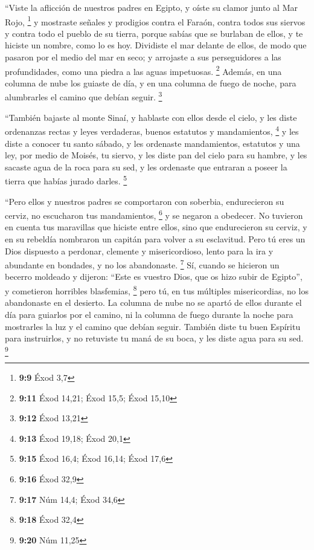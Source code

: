 \begin{paracol}{2}
 ``Viste la aflicción de nuestros padres en Egipto, y
oíste su clamor junto al Mar Rojo, \footnote{\textbf{9:9} Éxod 3,7}
 y mostraste señales y prodigios contra el Faraón, contra
todos sus siervos y contra todo el pueblo de su tierra, porque sabías
que se burlaban de ellos, y te hiciste un nombre, como lo es hoy.
 Dividiste el mar delante de ellos, de modo que pasaron
por el medio del mar en seco; y arrojaste a sus perseguidores a las
profundidades, como una piedra a las aguas impetuosas. \footnote{\textbf{9:11}
  Éxod 14,21; Éxod 15,5; Éxod 15,10}  Además, en una
columna de nube los guiaste de día, y en una columna de fuego de noche,
para alumbrarles el camino que debían seguir. \footnote{\textbf{9:12}
  Éxod 13,21}

 ``También bajaste al monte Sinaí, y hablaste con ellos
desde el cielo, y les diste ordenanzas rectas y leyes verdaderas, buenos
estatutos y mandamientos, \footnote{\textbf{9:13} Éxod 19,18; Éxod 20,1}
 y les diste a conocer tu santo sábado, y les ordenaste
mandamientos, estatutos y una ley, por medio de Moisés, tu siervo,
 y les diste pan del cielo para su hambre, y les sacaste
agua de la roca para su sed, y les ordenaste que entraran a poseer la
tierra que habías jurado darles. \footnote{\textbf{9:15} Éxod 16,4; Éxod
  16,14; Éxod 17,6}

 ``Pero ellos y nuestros padres se comportaron con
soberbia, endurecieron su cerviz, no escucharon tus mandamientos,
\footnote{\textbf{9:16} Éxod 32,9}  y se negaron a
obedecer. No tuvieron en cuenta tus maravillas que hiciste entre ellos,
sino que endurecieron su cerviz, y en su rebeldía nombraron un capitán
para volver a su esclavitud. Pero tú eres un Dios dispuesto a perdonar,
clemente y misericordioso, lento para la ira y abundante en bondades, y
no los abandonaste. \footnote{\textbf{9:17} Núm 14,4; Éxod 34,6}
 Sí, cuando se hicieron un becerro moldeado y dijeron:
``Este es vuestro Dios, que os hizo subir de Egipto'', y cometieron
horribles blasfemias, \footnote{\textbf{9:18} Éxod 32,4} 
pero tú, en tus múltiples misericordias, no los abandonaste en el
desierto. La columna de nube no se apartó de ellos durante el día para
guiarlos por el camino, ni la columna de fuego durante la noche para
mostrarles la luz y el camino que debían seguir.  También
diste tu buen Espíritu para instruirlos, y no retuviste tu maná de su
boca, y les diste agua para su sed. \footnote{\textbf{9:20} Núm 11,25}


\end{paracol}
